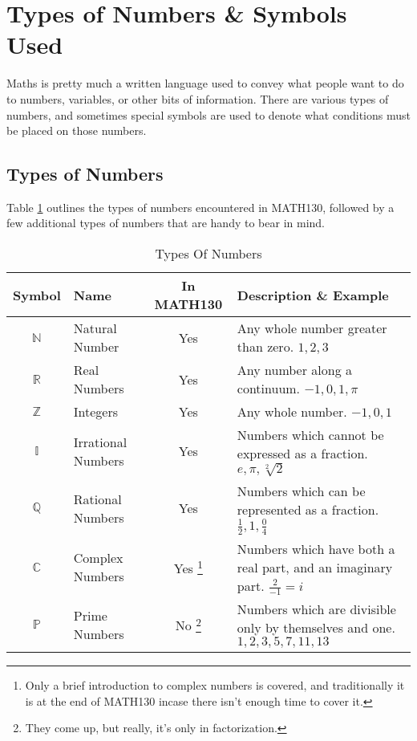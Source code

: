 \section{Types of Numbers \& Symbols Used}
\label{sec:TypesOfNumbersAndSymbolsUsed}
Maths is pretty much a written language used to convey what people want to do
to numbers, variables, or other bits of information. There are various types
of numbers, and sometimes special symbols are used to denote what conditions
must be placed on those numbers.\\
\subsection{Types of Numbers}
\label{sec:TypesOfNumbersUsed}
Table \ref{tab:TypesOfNumbers} outlines the types of numbers encountered in
MATH130, followed by a few additional types of numbers that are handy to bear
in mind.
\begin{table}[!htb]
\label{tab:TypesOfNumbers}
\begin{tabularx}{\linewidth}{| c | l | c | X |} \hline
  Symbol & Name & In MATH130 & Description \& Example \\ \hline \hline
  $\mathbb{N}$ & Natural Number     & Yes & Any whole number greater than
                                            zero. $1, 2, 3 $ \\ \hline
  $\mathbb{R}$ & Real Numbers       & Yes & Any number along a continuum.
                                            $-1, 0, 1, \pi $ \\ \hline
  $\mathbb{Z}$ & Integers           & Yes & Any whole number.
                                            $-1, 0, 1 $ \\ \hline
  $\mathbb{I}$ & Irrational Numbers & Yes & Numbers which cannot be expressed
                                            as a fraction.
                                            $e, \pi, \sqrt[2]{2} $ \\ \hline
  $\mathbb{Q}$ & Rational Numbers   & Yes & Numbers which can be represented as a
                                            fraction.
                                            $ \frac{1}{2}, 1, \frac{0}{4} $
                                            \\ \hline
  $\mathbb{C}$ & Complex Numbers    & Yes \footnote{Only a brief introduction
  to complex numbers is covered, and traditionally it is at the end of MATH130
  incase there isn't enough time to cover it.}
                                            & Numbers which have both a real
                                            part, and an imaginary part.
                                            $ \frac{2}{-1} = i $ \\ \hline
  $\mathbb{P}$ & Prime Numbers      & No \footnote{They come up, but really, it's
 only in factorization.}
                                            & Numbers which are divisible only
                                            by themselves and one.
                                            $1, 2, 3, 5, 7, 11, 13 $ \\  \hline
\end{tabularx}
\caption{Types Of Numbers}
\end{table}
\newpage
